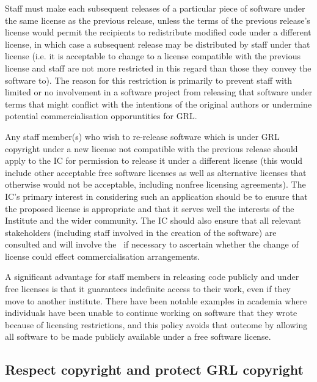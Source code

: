 \documentclass[10pt,a4paper]{article}
\begin{document}
\par Staff must make each subsequent releases of a particular piece of software 
under the same license as the previous release, unless the terms of the previous 
release's license would permit the recipients to redistribute modified code under a 
different license, in which case a subsequent release may be distributed by staff 
under that license (i.e. it is acceptable to change to a license compatible with 
the previous license and staff are not more restricted in this regard than those 
they convey the software to). The reason for this restriction is primarily to prevent 
staff with limited or no involvement in a software project from releasing that 
software under terms that might conflict with the intentions of the original 
authors or undermine potential commercialisation opporuntities for GRL. 

\par Any staff member(s) who wish to re-release software which is under GRL 
copyright under a new license not compatible with the previous release should 
apply to the IC for permission to release it under a different license (this would 
include other acceptable free software licenses as well as alternative licenses 
that otherwise would not be acceptable, including nonfree licensing 
agreements). The IC's primary interest in considering such an application 
should be to ensure that the proposed license is appropriate and that it serves 
well the interests of the Institute and the wider community. The IC should also 
ensure that all relevant stakeholders (including staff involved in the creation of 
the software) are consulted and will involve the \exectitle\ if necessary to 
ascertain whether the change of license could effect commercialisation 
arrangements. 

\par A significant advantage for staff members in releasing code publicly and 
under free licenses is that it guarantees indefinite access to their work, even 
if they move to another institute. There have been notable examples in 
academia where individuals have been unable to continue working on software 
that they wrote because of licensing restrictions, and this policy avoids that 
outcome by allowing all software to be made publicly available under a free 
software license. 


\subsection{Respect copyright and protect GRL copyright}
\label{section:policy.protection}
\end{document}
